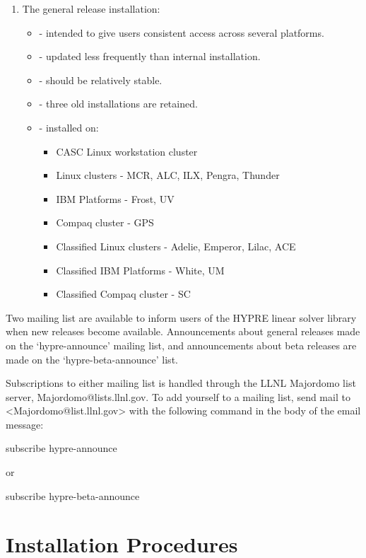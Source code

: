 \begin{enumerate}
\item The general release installation:
   \begin{itemize}
   \item - intended to give users consistent access across several platforms.
   \item - updated less frequently than internal installation.
   \item - should be relatively stable.
   \item - three old installations are retained.
   \item - installed on:
      \begin{itemize}
       \item CASC Linux workstation cluster
       \item Linux clusters - MCR, ALC, ILX, Pengra, Thunder
       \item IBM Platforms - Frost, UV
       \item Compaq cluster - GPS
       \item Classified Linux clusters - Adelie, Emperor, Lilac, ACE
       \item Classified IBM Platforms - White, UM
       \item Classified Compaq cluster - SC
      \end{itemize}
   \end{itemize}

\end{enumerate}

Two mailing list are available to inform users of the HYPRE
linear solver library when new releases become available.
Announcements about general releases made on the `hypre-announce'
mailing list, and announcements about beta releases are made on the
`hypre-beta-announce' list. 

Subscriptions to either mailing list is handled through the LLNL
Majordomo list server, Majordomo@lists.llnl.gov. To add yourself
to a mailing list, send mail to <Majordomo@list.llnl.gov> with
the following command in the body of the email message:

 subscribe hypre-announce

or

 subscribe hypre-beta-announce

\section{Installation Procedures}
\label{Installation Procedures}


